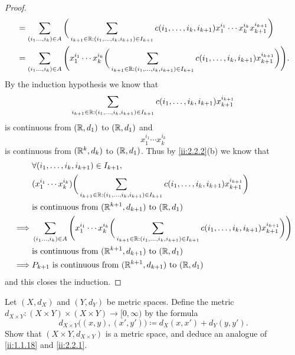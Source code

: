 \begin{proof}
\begin{align*}
     & = \sum_{(i_1 \dots, i_k) \in A} \bigg(\sum_{i_{k + 1} \in \mathbb{R} : (i_1, \dots, i_k, i_{k + 1}) \in I_{k + 1}} c(i_1, \dots, i_k, i_{k + 1}) x_1^{i_1} \cdots x_k^{i_k} x_{k + 1}^{i_{k + 1}}\bigg)              \\
     & = \sum_{(i_1 \dots, i_k) \in A} \Bigg(x_1^{i_1} \cdots x_k^{i_k} \bigg(\sum_{i_{k + 1} \in \mathbb{R} : (i_1, \dots, i_k, i_{k + 1}) \in I_{k + 1}} c(i_1, \dots, i_k, i_{k + 1}) x_{k + 1}^{i_{k + 1}}\bigg)\Bigg).
  \end{align*}
  By the induction hypothesis we know that
  \[
    \sum_{i_{k + 1} \in \mathbb{R} : (i_1, \dots, i_k, i_{k + 1}) \in I_{k + 1}} c(i_1, \dots, i_k, i_{k + 1}) x_{k + 1}^{i_{k + 1}}
  \]
  is continuous from \((\mathbb{R}, d_1)\) to \((\mathbb{R}, d_1)\) and
  \[
    x_1^{i_1} \cdots x_k^{i_k}
  \]
  is continuous from \((\mathbb{R}^k, d_k)\) to \((\mathbb{R}, d_1)\).
  Thus by \cref{ii:2.2.2}(b) we know that
  \begin{align*}
             & \forall (i_1, \dots, i_k, i_{k + 1}) \in I_{k + 1},                                                                                                                                                       \\
             & (x_1^{i_1} \cdots x_k^{i_k}) \bigg(\sum_{i_{k + 1} \in \mathbb{R} : (i_1, \dots, i_k, i_{k + 1}) \in I_{k + 1}} c(i_1, \dots, i_k, i_{k + 1}) x_{k + 1}^{i_{k + 1}}\bigg)                                         \\
             & \text{is continuous from } (\mathbb{R}^{k + 1}, d_{k + 1}) \text{ to } (\mathbb{R}, d_1)                                                                                                                                  \\
    \implies & \sum_{(i_1 \dots, i_k) \in A} \Bigg(x_1^{i_1} \cdots x_k^{i_k} \bigg(\sum_{i_{k + 1} \in \mathbb{R} : (i_1, \dots, i_k, i_{k + 1}) \in I_{k + 1}} c(i_1, \dots, i_k, i_{k + 1}) x_{k + 1}^{i_{k + 1}}\bigg)\Bigg) \\
             & \text{is continuous from } (\mathbb{R}^{k + 1}, d_{k + 1}) \text{ to } (\mathbb{R}, d_1)                                                                                                                                  \\
    \implies & P_{k + 1} \text{ is continuous from } (\mathbb{R}^{k + 1}, d_{k + 1}) \text{ to } (\mathbb{R}, d_1)
  \end{align*}
  and this closes the induction.
\end{proof}

\begin{ex}\label{ii:ex:2.2.8}
  Let \((X, d_X)\) and \((Y, d_Y)\) be metric spaces.
  Define the metric \(d_{X \times Y} : (X \times Y) \times (X \times Y) \to [0, \infty)\) by the formula
  \[
    d_{X \times Y}\big((x, y), (x', y')\big) \coloneqq d_X(x, x') + d_Y(y, y').
  \]
  Show that \((X \times Y, d_{X \times Y})\) is a metric space, and deduce an analogue of \cref{ii:1.1.18} and \cref{ii:2.2.1}.
\end{ex}

